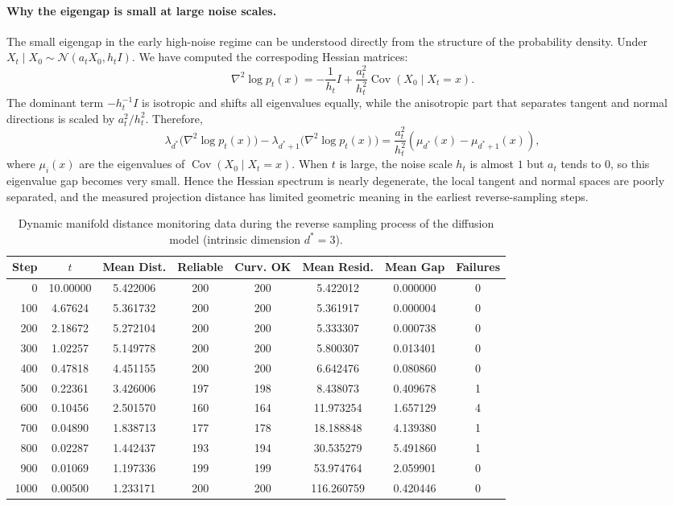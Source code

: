 \documentclass[11pt]{article}
\begin{document}
\paragraph{Why the eigengap is small at large noise scales.}
The small eigengap in the early high-noise regime can be understood directly from the structure of the probability density. Under
$X_t\mid X_0\sim \mathcal{N}(a_tX_0,h_tI)$. We have computed the correspoding Hessian matrices:
\[
\nabla^2\log p_t(x)
=
-\frac{1}{h_t}I
+
\frac{a_t^2}{h_t^2}
\operatorname{Cov}(X_0\mid X_t=x).
\]
The dominant term $-h_t^{-1}I$ is isotropic and shifts all eigenvalues equally, while the anisotropic part that separates tangent and normal directions is scaled by $a_t^2/h_t^2$. Therefore,
\[
\lambda_{d^*}\big(\nabla^2\log p_t(x)\big)
-
\lambda_{d^*+1}\big(\nabla^2\log p_t(x)\big)
=
\frac{a_t^2}{h_t^2}
\left(\mu_{d^*}(x)-\mu_{d^*+1}(x)\right),
\]
where $\mu_i(x)$ are the eigenvalues of $\operatorname{Cov}(X_0\mid X_t=x)$. When $t$ is large, the noise scale $h_t$ is almost $1$ but $a_t$ tends to $0$, so this eigenvalue gap becomes very small. Hence the Hessian spectrum is nearly degenerate, the local tangent and normal spaces are poorly separated, and the measured projection distance has limited geometric meaning in the earliest reverse-sampling steps.
\begin{table}[htbp]
\centering

\label{tab:manifold_monitoring}
\begin{tabular}{r c c c c c c c}
\toprule
Step & $t$ & Mean Dist. & Reliable & Curv. OK & Mean Resid. & Mean Gap & Failures \\
\midrule
0    & 10.00000 & 5.422006 & 200 & 200 & 5.422012   & 0.000000 & 0 \\
100  & 4.67624  & 5.361732 & 200 & 200 & 5.361917   & 0.000004 & 0 \\
200  & 2.18672  & 5.272104 & 200 & 200 & 5.333307   & 0.000738 & 0 \\
300  & 1.02257  & 5.149778 & 200 & 200 & 5.800307   & 0.013401 & 0 \\
400  & 0.47818  & 4.451155 & 200 & 200 & 6.642476   & 0.080860 & 0 \\
500  & 0.22361  & 3.426006 & 197 & 198 & 8.438073   & 0.409678 & 1 \\
600  & 0.10456  & 2.501570 & 160 & 164 & 11.973254  & 1.657129 & 4 \\
700  & 0.04890  & 1.838713 & 177 & 178 & 18.188848  & 4.139380 & 1 \\
800  & 0.02287  & 1.442437 & 193 & 194 & 30.535279  & 5.491860 & 1 \\
900  & 0.01069  & 1.197336 & 199 & 199 & 53.974764  & 2.059901 & 0 \\
1000 & 0.00500  & 1.233171 & 200 & 200 & 116.260759 & 0.420446 & 0 \\
\bottomrule
\end{tabular}
\vspace{0.5em}
\caption{Dynamic manifold distance monitoring data during the reverse sampling process of the diffusion model (intrinsic dimension $d^*=3$).}
\end{table}
\end{document}
